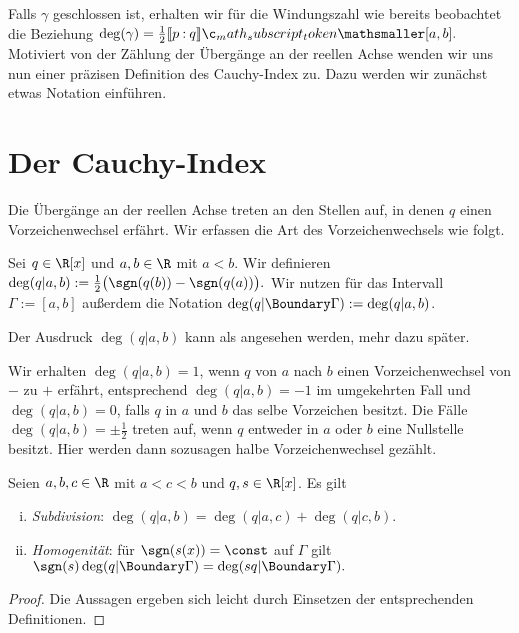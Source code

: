 \documentclass{mythesis}
\begin{document}
Falls $\gamma$ geschlossen ist, erhalten wir für die Windungszahl wie bereits beobachtet die Beziehung
\begin{math}
    \deg(\gamma) = \frac{1}{2} \Index{[a,b]}{p}{q}.
\end{math}
Motiviert von der Zählung der Übergänge an der reellen Achse wenden wir uns nun einer präzisen Definition des Cauchy-Index zu.
Dazu werden wir zunächst etwas Notation einführen.



\section{Der Cauchy-Index}

Die Übergänge an der reellen Achse treten an den Stellen auf, in denen $q$ einen Vorzeichenwechsel erfährt.
Wir erfassen die Art des Vorzeichenwechsels wie folgt.

\begin{definition}
    Sei $q \in \R[x]$ und $a, b \in \R$ mit $a < b$.
    Wir definieren
    \begin{math}
        \deg(q|a,b) := \frac{1}{2} \big(\sgn(q(b)) - \sgn(q(a)) \big).
    \end{math}
    Wir nutzen für das Intervall $\Gamma := [a,b]$ außerdem die Notation $\deg(q|\Boundary\Gamma) := \deg(q|a,b)$.
    \begin{note}
        Der Ausdruck $\deg(q|a,b)$ kann als  angesehen werden, mehr dazu später.
    \end{note}
\end{definition}

Wir erhalten $\deg(q|a,b) = 1$, wenn $q$ von $a$ nach $b$ einen Vorzeichenwechsel von $-$ zu $+$ erfährt, entsprechend $\deg(q|a,b) = -1$ im umgekehrten Fall und $\deg(q|a,b) = 0$, falls $q$ in $a$ und $b$ das selbe Vorzeichen besitzt.
Die Fälle $\deg(q|a,b) = \pm \frac{1}{2}$ treten auf, wenn $q$ entweder in $a$ oder $b$ eine Nullstelle besitzt.
Hier werden dann sozusagen halbe Vorzeichenwechsel gezählt.

\begin{lemma}[Eigenschaften] \label{thm:lem:wn0_prop}
    Seien $a,b,c \in \R$ mit $a < c < b$ und $q, s \in \R[x]$.
    Es gilt
    \begin{enumerate}[i)]
        \item
            \emph{Subdivision}: $\deg(q|a,b) = \deg(q|a,c) + \deg(q|c,b)$.
        \item
            \emph{Homogenität}: für $\sgn(s(x)) = \const$ auf $\Gamma$ gilt
            \begin{math}
                \sgn(s) \deg(q|\Boundary\Gamma) = \deg(sq|\Boundary\Gamma).
            \end{math}
    \end{enumerate}
    \begin{proof}
        Die Aussagen ergeben sich leicht durch Einsetzen der entsprechenden Definitionen.
    \end{proof}
\end{lemma}
\end{document}
